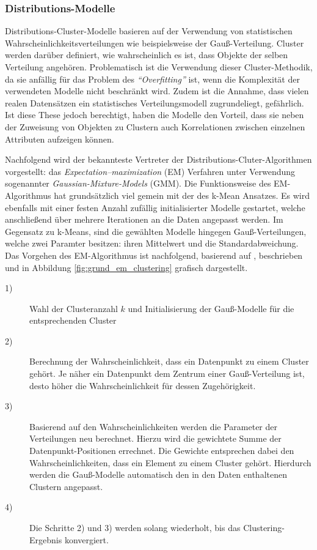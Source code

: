 \subsubsection{Distributions-Modelle}

Distributions-Cluster-Modelle basieren auf der Verwendung von statistischen Wahrscheinlichkeitsverteilungen wie
beispielsweise der Gauß-Verteilung. Cluster werden darüber definiert, wie wahrscheinlich es ist, dass Objekte
der selben Verteilung angehören. Problematisch ist die Verwendung dieser Cluster-Methodik, da sie anfällig für
das Problem des \textit{``Overfitting''} ist, wenn die Komplexität der verwendeten Modelle nicht beschränkt wird.
Zudem ist die Annahme, dass vielen realen Datensätzen ein statistisches Verteilungsmodell zugrundeliegt, gefährlich.
Ist diese These jedoch berechtigt, haben die Modelle den Vorteil, dass sie neben der Zuweisung von Objekten zu Clustern
auch Korrelationen zwischen einzelnen Attributen aufzeigen können. \cite[]{AndersDrachen2014}

Nachfolgend wird der bekannteste Vertreter der Distributions-Cluter-Algorithmen vorgestellt:
das \textit{Expectation–maximization} (EM) Verfahren unter Verwendung sogenannter \textit{Gaussian-Mixture-Models} (GMM).
Die Funktionsweise des EM-Algorithmus hat grundsätzlich viel gemein mit der des k-Mean Ansatzes.
Es wird ebenfalls mit einer festen Anzahl zufällig initialisierter Modelle gestartet, welche anschließend über mehrere Iterationen
an die Daten angepasst werden. Im Gegensatz zu k-Means, sind die gewählten Modelle hingegen Gauß-Verteilungen,
welche zwei Paramter besitzen: ihren Mittelwert und die Standardabweichung.
Das Vorgehen des EM-Algorithmus ist nachfolgend, basierend auf \cite[]{GeorgeSeif2018}, beschrieben und in
Abbildung \ref{fig:grund_em_clustering} grafisch dargestellt.

\begin{description}
    \item[1)] Wahl der Clusteranzahl $k$ und Initialisierung der Gauß-Modelle für die entsprechenden Cluster
    \item[2)] Berechnung der Wahrscheinlichkeit, dass ein Datenpunkt zu einem Cluster gehört. Je näher
              ein Datenpunkt dem Zentrum einer Gauß-Verteilung ist, desto höher die Wahrscheinlichkeit für dessen Zugehörigkeit.
    \item[3)] Basierend auf den Wahrscheinlichkeiten werden die Parameter der Verteilungen neu berechnet.
              Hierzu wird die gewichtete Summe der Datenpunkt-Positionen errechnet. Die Gewichte entsprechen dabei
              den Wahrscheinlichkeiten, dass ein Element zu einem Cluster gehört. Hierdurch werden die Gauß-Modelle automatisch
              den in den Daten enthaltenen Clustern angepasst.
    \item[4)] Die Schritte 2) und 3) werden solang wiederholt, bis das Clustering-Ergebnis konvergiert.
\end{description}

